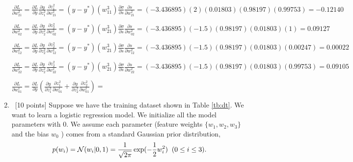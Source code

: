 \documentclass[12pt, fullpage,letterpaper]{article}
\begin{document}
\begin{enumerate}
	$\frac{\partial L}{\partial w^{2}_{21}} = \frac{\partial L}{\partial y}\frac{\partial y}{\partial z^2_1}\frac{\partial z^2_1}{\partial w^{2}_{21}} = (y-y^*)(w^{3}_{11})\frac{\partial \sigma}{\partial s}\frac{\partial s}{\partial w^{2}_{21}} = (-3.436895)(2)(0.01803)(0.98197)(0.99753) = -0.12140$
	
	$\frac{\partial L}{\partial w^{2}_{02}} = \frac{\partial L}{\partial y}\frac{\partial y}{\partial z^2_2}\frac{\partial z^2_2}{\partial w^{2}_{02}} = (y-y^*)(w^{3}_{21})\frac{\partial \sigma}{\partial s}\frac{\partial s}{\partial w^{2}_{02}} = (-3.436895)(-1.5)(0.98197)(0.01803)(1) = 0.09127$

	$\frac{\partial L}{\partial w^{2}_{12}} = \frac{\partial L}{\partial y}\frac{\partial y}{\partial z^2_2}\frac{\partial z^2_2}{\partial w^{2}_{12}} = (y-y^*)(w^{3}_{21})\frac{\partial \sigma}{\partial s}\frac{\partial s}{\partial w^{2}_{12}} = (-3.436895)(-1.5)(0.98197)(0.01803)(0.00247) = 0.00022$
	
	$\frac{\partial L}{\partial w^{2}_{22}} = \frac{\partial L}{\partial y}\frac{\partial y}{\partial z^2_2}\frac{\partial z^2_2}{\partial w^{2}_{22}} = (y-y^*)(w^{3}_{21})\frac{\partial \sigma}{\partial s}\frac{\partial s}{\partial w^{2}_{22}} = (-3.436895)(-1.5)(0.98197)(0.01803)(0.99753) = 0.09105$

	$\frac{\partial L}{\partial w^{1}_{01}} = \frac{\partial L}{\partial y}(\frac{\partial y}{\partial z^2_1}\frac{\partial z^2_1}{\partial w^{1}_{01}} + \frac{\partial y}{\partial z^2_2}\frac{\partial z^2_2}{\partial w^{1}_{01}}) = $
	
	
	\item~[10 points] Suppose we have the training dataset shown in Table \ref{tb:dt}. We want to learn a logistic regression model. We initialize all the model parameters with $0$.  We assume each parameter (\ie feature weights $\{w_1, w_2, w_3\}$ and the bias $w_0$ ) comes from a standard Gaussian prior distribution, 
	\[
	p(w_i) = \mathcal{N}(w_i|0,1) = \frac{1}{\sqrt{2\pi}}\exp(-\frac{1}{2}w_i^2)\;\;(0\le i\le 3).
	\]
	

\end{enumerate}
\end{document}
